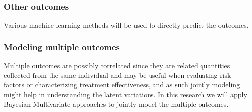 \subsubsection{Other outcomes}
Various machine learning methods will be used to directly predict the outcomes.

\subsubsection{Modeling multiple outcomes}

Multiple outcomes are possibly correlated since they are related quantities collected from the same individual and may be useful when evaluating risk factors or characterizing treatment effectiveness, and as such jointly modeling might help in understanding the latent variations. In this research we will apply Bayesian Multivariate approaches to jointly model the multiple outcomes.

\small{
%


}

